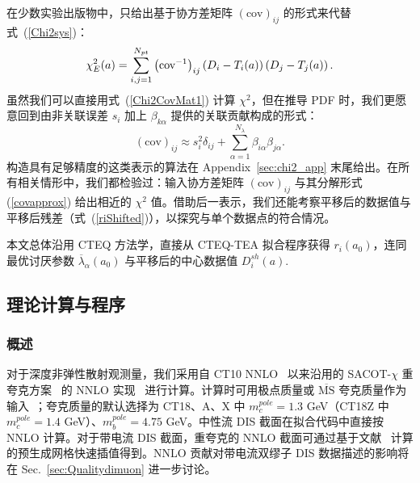 在少数实验出版物中，只给出基于协方差矩阵 $\left(\mbox{cov}\right)_{ij}$ 的形式来代替式~(\ref{Chi2sys})：
\begin{equation}
\chi_{E}^{2}(a)=\sum_{i,j=1}^{N_{pt}}\left(\mbox{\mbox{cov}}^{-1}\right)_{ij}\left(D_{i}-T_{i}(a)\right)\left(D_{j}-T_{j}(a)\right).\label{Chi2CovMat1}
\end{equation}
虽然我们可以直接用式~(\ref{Chi2CovMat1}) 计算 $\chi^2$，但在推导 PDF 时，我们更愿意回到由非关联误差 $s_i$ 加上 $\beta_{k\alpha}$ 提供的关联贡献构成的形式：
\begin{equation}
  (\mbox{cov})_{ij} \approx s_i^2 \delta_{ij}
  +\sum_{\alpha=1}^{N_\lambda} \beta_{i\alpha}\beta_{j\alpha}.\label{covapprox}
\end{equation}
构造具有足够精度的这类表示的算法在 Appendix~\ref{sec:chi2_app} 末尾给出。在所有相关情形中，我们都检验过：输入协方差矩阵 $(\mbox{cov})_{ij}$ 与其分解形式 (\ref{covapprox}) 给出相近的 $\chi^2$ 值。借助后一表示，我们还能考察平移后的数据值与平移后残差（式~(\ref{riShifted})），以探究与单个数据点的符合情况。

本文总体沿用 CTEQ 方法学，直接从 CTEQ-TEA 拟合程序获得 $r_{i}(a_0)$，连同最优讨厌参数 $\overline{\lambda}_{\alpha}(a_0)$ 与平移后的中心数据值 $D_{i}^{sh}(a).$

\subsection{理论计算与程序 \label{sec:calcs}}
\subsubsection{概述
\label{sec:TheorySettings}}

对于深度非弹性散射观测量，我们采用自 CT10 NNLO~\cite{Gao:2013xoa} 以来沿用的 SACOT-$\chi$ 重夸克方案~\cite{Aivazis:1993pi,Aivazis:1993kh,Kramer:2000hn,Tung:2001mv} 的 NNLO 实现~\cite{Guzzi:2011ew} 进行计算。计算时可用极点质量或 $\overline{\mathrm{MS}}$ 夸克质量作为输入~\cite{Gao:2013wwa}；夸克质量的默认选择为 CT18、A、X 中 $m_c^{pole}=1.3$ GeV（CT18Z 中 $m_c^{pole}=1.4$ GeV）、$m_b^{pole}=4.75$ GeV。中性流 DIS 截面在拟合代码中直接按 NNLO 计算。对于带电流 DIS 截面，重夸克的 NNLO 截面可通过基于文献~\cite{Berger:2016inr} 计算的预生成网格快速插值得到。NNLO 贡献对带电流双缪子 DIS 数据描述的影响将在 Sec.~\ref{sec:Qualitydimuon} 进一步讨论。

